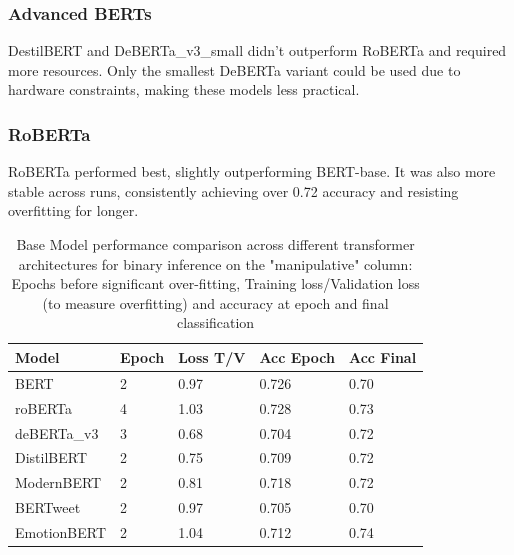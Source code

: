 \documentclass[
	letterpaper, %
	12pt, %
	unnumberedsections, %
	twoside, %
]{LTJournalArticle}
\begin{document}
\subsubsection{Advanced BERTs}
DestilBERT and DeBERTa\_v3\_small didn’t outperform RoBERTa and required more resources. Only the smallest DeBERTa variant could be used due to hardware constraints, making these models less practical.

\subsubsection{RoBERTa}
RoBERTa performed best, slightly outperforming BERT-base. It was also more stable across runs, consistently achieving over 0.72 accuracy and resisting overfitting for longer.

\begin{table}[h!]
	\small
	\begin{tabular}{|p{2.2cm}|p{0.9cm}|p{1cm}|p{1cm}|p{1cm}|}
		\hline
		\textbf{Model} & \textbf{Epoch} & \textbf{Loss T/V} & \textbf{Acc Epoch} & \textbf{Acc Final} \\
		\hline
		BERT           & 2              & 0.97              & 0.726              & 0.70               \\
		roBERTa        & 4              & 1.03              & 0.728              & 0.73               \\
		deBERTa\_v3    & 3              & 0.68              & 0.704              & 0.72               \\
		DistilBERT     & 2              & 0.75              & 0.709              & 0.72               \\
		ModernBERT     & 2              & 0.81              & 0.718              & 0.72               \\
		BERTweet       & 2              & 0.97              & 0.705              & 0.70               \\
		EmotionBERT    & 2              & 1.04              & 0.712              & 0.74               \\
		\hline
	\end{tabular}
	\caption{Base Model performance comparison across different transformer architectures for binary inference on the "manipulative" column: Epochs before significant over-fitting, Training loss/Validation loss (to measure  overfitting) and accuracy at epoch and final classification }
	\label{tab:BaseModelPerformance}
\end{table}
\end{document}
